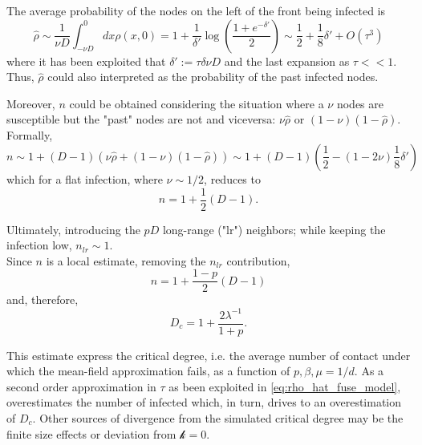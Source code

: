 \documentclass[a4paper,10pt,twoside]{book} %
\theoremstyle{definition}
\begin{document}
The average probability of the nodes on the left of the front being infected is
\begin{equation}
	\hat{\rho} \sim \frac{1}{\nu D} \int_{-\nu D}^{0} dx \rho(x,0) = 1+ \frac{1}{\delta'} \log( \frac{1+e^{-\delta'}}{2} )
	\sim \frac{1}{2} + \frac{1}{8} \delta' + O(\tau^3) 
	\label{eq:rho_hat_fuse_model}
\end{equation}
where it has been exploited that $\delta':=\tau \delta \nu D$ and the last expansion as $\tau<<1$. Thus, $\hat{\rho}$ could also interpreted as the probability of the past infected nodes.

Moreover, $n$ could be obtained considering the situation where a $\nu$ nodes are susceptible but the "past" nodes are not and viceversa: $\nu \hat{\rho} \text{ or } (1-\nu)(1- \hat{\rho})$. 
\\Formally,
\begin{equation}
	n \sim 1+ (D-1)(\nu\hat{\rho}+(1-\nu)(1-\hat{\rho}))
	\sim 1+ (D-1)(\frac{1}{2} - (1-2\nu) \frac{1}{8} \delta')
\end{equation}
which for a flat infection, where $\nu\sim 1/2$, reduces to
\begin{equation}
	n = 1 + \frac{1}{2}(D-1).
\end{equation} 

Ultimately, introducing the $pD$ long-range ("lr") neighbors; while keeping the infection low, $n_{lr} \sim 1$.
\\Since $n$ is a local estimate, removing the $n_{lr}$ contribution,
\begin{equation}
	n = 1 + \frac{1-p}{2}(D-1)
\end{equation}   
and, therefore,
\begin{equation}
	D_c = 1+ \frac{2 \lambda^{-1}}{1+p}.
	\label{eq:final_D_c_fuse_network}
\end{equation}

This estimate express the critical degree, i.e. the average number of contact under which the mean-field approximation fails, as a function of $p,\beta,\mu = 1/d$. As a second order approximation in $\tau$ as been exploited in \autoref{eq:rho_hat_fuse_model}, overestimates the number of infected which, in turn, drives to an overestimation of $D_c$. Other sources of divergence from the simulated critical degree may be the finite size effects or deviation from $\mathcal{k} = 0$.
\end{document}
